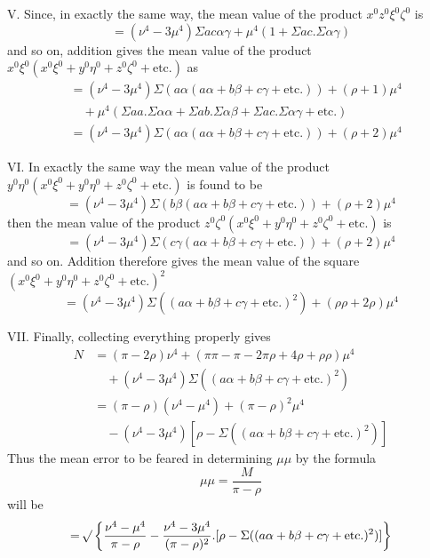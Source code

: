 V. Since, in exactly the same way, the mean value of the product \(x^0z^0\xi^0\zeta^0\) is
\[
=(\nu^4-3\mu^4)\Sigma ac\alpha\gamma+\mu^4(1+\Sigma ac.\Sigma\alpha\gamma)
\]
and so on, addition gives the mean value of the product \(x^0\xi^0(x^0\xi^0+y^0\eta^0+z^0\zeta^0+\text{etc.})\) as
\[
\begin{aligned}
&=(\nu^4-3\mu^4)\Sigma(a\alpha(a\alpha+b\beta+c\gamma+\text{etc.}))+(\rho+1)\mu^4\\
&\quad+\mu^4(\Sigma aa.\Sigma\alpha\alpha+\Sigma ab.\Sigma\alpha\beta+\Sigma ac.\Sigma\alpha\gamma+\text{etc.})\\
&=(\nu^4-3\mu^4)\Sigma(a\alpha(a\alpha+b\beta+c\gamma+\text{etc.}))+(\rho+2)\mu^4
\end{aligned}
\]

VI. In exactly the same way the mean value of the product \(y^0\eta^0(x^0\xi^0+y^0\eta^0+z^0\zeta^0+\text{etc.})\) is found to be
\[
=(\nu^4-3\mu^4)\Sigma(b\beta(a\alpha+b\beta+c\gamma+\text{etc.}))+(\rho+2)\mu^4
\]
then the mean value of the product \(z^0\zeta^0(x^0\xi^0+y^0\eta^0+z^0\zeta^0+\text{etc.})\) is
\[
=(\nu^4-3\mu^4)\Sigma(c\gamma(a\alpha+b\beta+c\gamma+\text{etc.}))+(\rho+2)\mu^4
\]
and so on. Addition therefore gives the mean value of the square \((x^0\xi^0+y^0\eta^0+z^0\zeta^0+\text{etc.})^2\)
\[
=(\nu^4-3\mu^4)\Sigma((a\alpha+b\beta+c\gamma+\text{etc.})^2)+(\rho\rho+2\rho)\mu^4
\]

VII. Finally, collecting everything properly gives
\[
\begin{aligned}
N&=(\pi-2\rho)\nu^4+(\pi\pi-\pi-2\pi\rho+4\rho+\rho\rho)\mu^4\\
&\quad+(\nu^4-3\mu^4)\Sigma((a\alpha+b\beta+c\gamma+\text{etc.})^2)\\
&=(\pi-\rho)(\nu^4-\mu^4)+(\pi-\rho)^2\mu^4\\
&\quad-(\nu^4-3\mu^4)[\rho-\Sigma((a\alpha+b\beta+c\gamma+\text{etc.})^2)]
\end{aligned}
\]
Thus the mean error to be feared in determining \(\mu\mu\) by the formula
\[
\mu\mu=\frac{M}{\pi-\rho}
\]
will be
\[
=\mathord{{}^{}\!\surd}\left\{\frac{\nu^4-\mu^4}{\pi-\rho}-\frac{\nu^4-3\mu^4}{(\pi-\rho)^2}.[\rho-\Sigma((a\alpha+b\beta+c\gamma+\text{etc.})^2)]\right\}
\]

